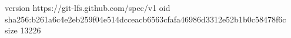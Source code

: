 version https://git-lfs.github.com/spec/v1
oid sha256:b261a6c4e2eb259f04e514dcceacb6563cfafa46986d3312e52b1b0c58478f6c
size 13226
